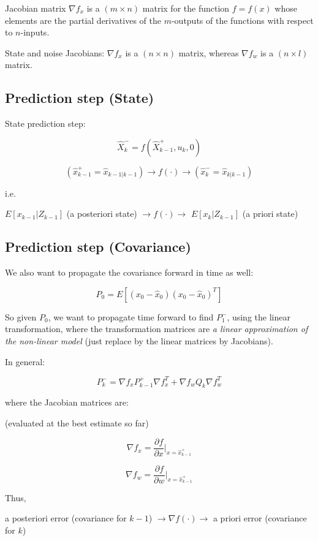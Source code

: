 \documentclass[11pt]{article}
\begin{document}
Jacobian matrix $\nabla f_x$ is a $(m \times n)$ matrix for the function $f = f(x)$ whose elements are the partial 
derivatives of the $m$-outputs of the functions with respect to $n$-inputs.


State and noise Jacobians:
$\nabla f_x$ is a $ (n \times n) $ matrix, whereas $\nabla f_w$ is a $ (n \times l) $ matrix.

\subsection{Prediction step (State)}

State prediction step:

\[ \hat{X}^-_k = f(\hat{X}^+_{k-1}, u_k, 0) \]

\[ (\hat{x}^+_{k-1} = \hat{x}_{k-1|k-1}) \rightarrow f(\cdot) \rightarrow (\hat{x}^-_k = \hat{x}_{k|k-1})\]

i.e.

$E[x_{k-1} | Z_{k-1}]$ (a posteriori state) $\rightarrow f(\cdot) \rightarrow $ $E[x_{k} | Z_{k-1}]$ (a priori state) 


\subsection{Prediction step (Covariance)}
We also want to propagate the covariance forward in time as well: 

\[ P_0 = E[ (x_0 - \hat{x}_0) (x_0 - \hat{x}_0)^T] \]

So given $P_0$, we want to propagate time forward to find $P_1^-$, using the linear transformation, where the transformation matrices
are \textit{a linear approximation of the non-linear model} (just replace by the linear matrices by Jacobians).

In general:

\[ P^-_k = \nabla  f_x P^+_{k-1} \nabla f^T_x  + \nabla f_w Q_k \nabla f_w^T\]

where the Jacobian matrices are:

(evaluated at the best estimate so far)

\[ \nabla f_x = \frac{\partial f}{ \partial x} \vert _{x= \hat{x}^+_{k-1}} \]

\[ \nabla f_w = \frac{\partial f}{ \partial w} \vert _{x= \hat{x}^+_{k-1}} \]


Thus,


a posteriori error (covariance for $k-1$) $\rightarrow \nabla f(\cdot)  \rightarrow $ a priori error (covariance for $k$)
\end{document}
